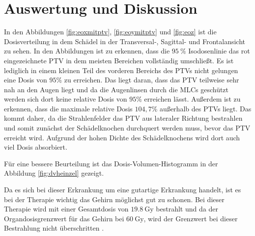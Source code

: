 \section{Auswertung und Diskussion}
\label{sec:DiskussionAuswertung}
In den Abbildungen \ref{fig:eoxmitptv}, \ref{fig:eoymitptv} und \ref{fig:eoz} ist die Dosisverteilung in dem Schädel in der
Transversal-, Sagittal- und Frontalansicht zu sehen. In den Abbildungen ist zu erkennen, dass die $\SI{95}{\percent}$ Isodosenlinie das
rot eingezeichnete PTV in dem meisten Bereichen vollständig umschließt. Es ist lediglich in einem kleinen Teil des vorderen Bereichs des PTVs nicht
gelungen eine Dosis von $95\%$ zu erreichen. Das liegt daran, dass das PTV teilweise sehr nah an den Augen liegt und da die Augenlinsen durch die
MLCs geschützt werden sich dort keine relative Dosis von $95\%$ erreichen lässt. Außerdem ist zu erkennen, dass die maximale relative Dosis
$104,7\%$ außerhalb des PTVs liegt. Das kommt daher, da die Strahlenfelder das PTV aus lateraler Richtung bestrahlen und somit zunächst der Schädelknochen
durchquert werden muss, bevor das PTV erreicht wird. Aufgrund der hohen Dichte des Schädelknochens wird dort auch viel Dosis absorbiert.


Für eine bessere Beurteilung ist das Dosis-Volumen-Histogramm in der Abbildung \ref{fig:dvheinzel} gezeigt.

Da es sich bei dieser Erkrankung um eine gutartige Erkrankung handelt, ist es bei der Therapie wichtig das Gehirn möglichst gut zu schonen.
Bei dieser Therapie wird mit einer Gesamtdosis von $\SI{19.8}{\gray}$ bestrahlt und da der Organdosisgrenzwert für
das Gehirn bei $\SI{60}{\gray}$, wird der Grenzwert bei dieser Bestrahlung nicht überschritten \cite{QUANTEC}.

